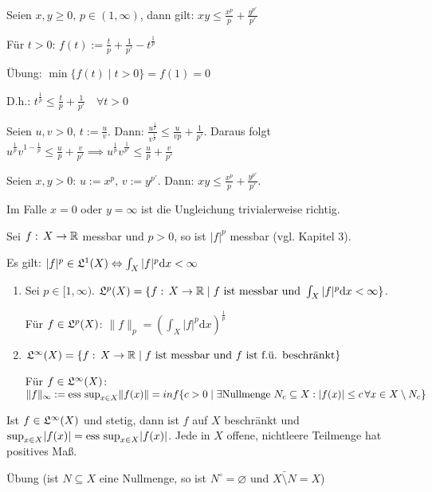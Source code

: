 \documentclass[a4paper,twoside,DIV15,BCOR12mm,chapterprefix=true,headings=onelinechapter]{scrbook}
\begin{document}
\begin{hilfssatz}
Seien \(x,y\geq 0,\,p\in(1,\infty)\), dann gilt: \(xy\leq\frac{x^{p}}{p}+\frac{y^{p'}}{p'}\)
\end{hilfssatz}
\begin{beweis}
F\"ur \(t>0:\,f(t):=\frac{t}{p}+\frac{1}{p'}-t^{\frac{1}{p}}\)

\"Ubung: \(\min\{f(t)\mid t>0\}=f(1)=0\)

D.h.: \(t^{\frac{1}{p}}\leq\frac{t}{p}+\frac{1}{p'}\quad\forall t>0\)

Seien \(u,v>0,\,t:=\frac{u}{v}\). Dann: \(\frac{u^{\frac{1}{p}}}{v^{\frac{1}{p}}}\leq\frac{u}{vp}+\frac{1}{p'}\). Daraus folgt
\(u^{\frac{1}{p}}v^{1-\frac{1}{p}}\leq\frac{u}{p}+\frac{v}{p'}\implies u^{\frac{1}{p}}v^{\frac{1}{p'}}\leq \frac{u}{p}+\frac{v}{p'}\)

Seien \(x,y>0:\,u:=x^{p},\,v:=y^{p'}\). Dann: \(xy\leq\frac{x^{p}}{p}+\frac{y^{p'}}{p'}\).

Im Falle \(x=0\) oder \(y=\infty\) ist die Ungleichung trivialerweise richtig.
\end{beweis}

\begin{erinnerung}
Sei \(f:\,X\to\mathbb{R}\) messbar und \(p>0\), so ist \(\lvert f\rvert^{p}\) messbar (vgl. Kapitel 3).

Es gilt: \(\lvert f\rvert^{p}\in\mathfrak{L}^{1}(X)\Leftrightarrow \int_{X}{\lvert f\rvert^{p}\mathrm{d}x}<\infty\)
\end{erinnerung}

\begin{definition}
\begin{enumerate}
\item Sei \(p\in[1,\infty)\). \(\mathfrak{L}^{p}(X)=\{f:\,X\to\mathbb{R}\mid f \text{ ist messbar und }\int_{X}{\lvert f\rvert^{p}\mathrm{d}x<\infty}\}\).

F\"ur \(f\in\mathfrak{L}^{p}(X)\): \(\lVert f\rVert_{p}=\left(\int_{X}{\lvert f\rvert^{p}\mathrm{d}x}\right)^{\frac{1}{p}}\)
\item \(\mathfrak{L}^{\infty}(X)=\{f:\,X\to\mathbb{R}\mid f\text{ ist messbar und }f\text{ ist f.\"u. beschr\"ankt}\}\)

F\"ur \(f\in\mathfrak{L}^{\infty}(X)\): \(\lVert f\rVert_{\infty}:=\text{ess sup}_{x\in X}\lVert f(x)\rVert=inf\{c>0\mid \exists\text{Nullmenge }N_{c}\subseteq X: \lvert f(x)\rvert\leq c\,\forall x\in X\setminus N_{c}\}\)
\end{enumerate}
\end{definition}

\begin{bemerkung}
Ist \(f\in\mathfrak{L}^{\infty}(X)\) und stetig, dann ist \(f\) auf \(X\) beschr\"ankt und \(\sup_{x\in X}\lvert f(x)\rvert=\text{ess sup}_{x\in X}\lvert f(x)\rvert\). Jede in \(X\) offene, nichtleere Teilmenge hat positives Ma\ss.
\end{bemerkung}
\begin{beweis}
\"Ubung (ist \(N\subseteq X\) eine Nullmenge, so ist \(N^{\circ}=\varnothing\) und \(\bar{X\setminus N}=X\))
\end{beweis}
\end{document}
